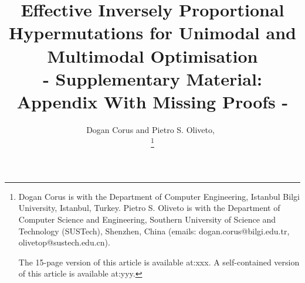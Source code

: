 \documentclass[lettersize,journal]{IEEEtran}
\begin{document}
\title{Effective Inversely Proportional Hypermutations for Unimodal and Multimodal Optimisation\\ - Supplementary Material: Appendix With Missing Proofs -}

%
%

\author{Dogan Corus	 and Pietro S. Oliveto,~

\thanks{
Dogan Corus is with the Department of Computer Engineering, Istanbul Bilgi University, Istanbul, Turkey. 
Pietro S. Oliveto is with the Department of Computer Science and Engineering, Southern University of Science and Technology (SUSTech), Shenzhen, China
(emails: dogan.corus@bilgi.edu.tr, olivetop@sustech.edu.cn). 

The 15-page version of this article is available at:xxx. A self-contained version of this article is available at:yyy.
}

}




\maketitle
\end{document}
